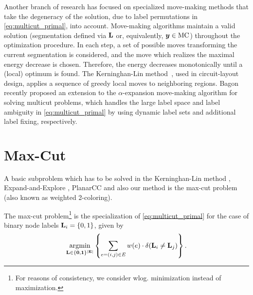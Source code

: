 Another branch of research has focused on specialized move-making methods
\cite{kerninghan_1970_bell,zhao_2005_mp,bagon_2011_arxiv}
that take the degeneracy of the solution,
due to label permutations in \eqref{eq:multicut_primal}, into account.
%
Move-making algorithms maintain a valid solution (segmentation defined 
via $\mathbf{L}$ or, equivalently, $\boldsymbol y \in \text{MC}$) throughout the
optimization procedure. In each step, a set of possible moves transforming
the current segmentation is considered,
and the move which realizes the maximal
energy decrease is chosen. Therefore, the energy decreases monotonically
until a (local) optimum is found.
%
The Kerninghan-Lin method~\cite{kerninghan_1970_bell},
used in circuit-layout design, applies a sequence of 
greedy local moves to neighboring regions.
Bagon~\cite{bagon_2011_arxiv} recently proposed an 
extension to the
$\alpha$-expansion move-making algorithm
for solving multicut problems, which handles the large label space
and label ambiguity in \eqref{eq:multicut_primal} by using dynamic label
sets and additional label fixing, respectively.







\section{Max-Cut\label{sec:max_cut}}
A basic subproblem which has to be solved in
the Kerninghan-Lin method \cite{kerninghan_1970_bell},
Expand-and-Explore \cite{bagon_2011_arxiv},
PlanarCC \cite{yarkony_2012_eccv} and also our method is the
max-cut problem \cite{deza1997geometry} (also known as weighted 2-coloring).

The max-cut problem\footnote{%
For reasons of consistency, we consider wlog. minimization instead of maximization.
}
is the specialization of \eqref{eq:multicut_primal}
for the case of binary node labels $\mathbf{L}_i = \{0,1\}$, given by
\begin{align}
\operatorname*{\arg\!\min}_{\mathbf{L \in \{0,1\}^{|E|}}}
         \left\{
            \sum_{e=(i,j)\in E} w(e)
                \cdot \delta( \mathbf{L}_i \neq \mathbf{L}_j )
         \right\}
         \label{eq:max_cut}.
\end{align}

